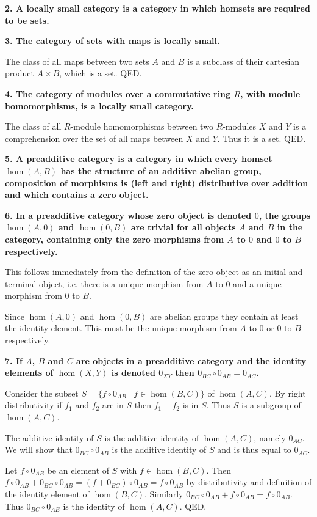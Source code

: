 \documentclass[12pt]{article}
\begin{document}
\textbf{2. A locally small category is a category in which homsets are required to be sets.}

\textbf{3. The category of sets with maps is locally small.}

The class of all maps between two sets $A$ and $B$ is a subclass of their cartesian product $A\times B$, which is a set. QED.

\textbf{4. The category of modules over a commutative ring $R$, with module homomorphisms, is a locally small category.}

The class of all $R$-module homomorphisms between two $R$-modules $X$ and $Y$ is a comprehension over the set of all maps between $X$ and $Y$. Thus it is a set. QED.

\textbf{5. A preadditive category is a category in which every homset $\hom(A, B)$ has the structure of an additive abelian group, composition of morphisms is (left and right) distributive over addition and which contains a zero object.}

\textbf{6. In a preadditive category whose zero object is denoted $0$, the groups $\hom(A, 0)$ and $\hom(0, B)$ are trivial for all objects $A$ and $B$ in the category, containing only the zero morphisms from $A$ to $0$ and $0$ to $B$ respectively.}

This follows immediately from the definition of the zero object as an initial and terminal object, i.e. there is a unique morphism from $A$ to $0$ and a unique morphism from $0$ to $B$.

Since $\hom(A, 0)$ and $\hom(0, B)$ are abelian groups they contain at least the identity element. This must be the unique morphism from $A$ to $0$ or $0$ to $B$ respectively.

\textbf{7. If $A$, $B$ and $C$ are objects in a preadditive category and the identity elements of $\hom(X, Y)$ is denoted $0_{XY}$ then $0_{BC}\circ 0_{AB} = 0_{AC}$.}

Consider the subset $S = \{f\circ 0_{AB} \;|\; f \in \hom(B, C)\}$ of $\hom(A, C)$. By right distributivity if $f_1$ and $f_2$ are in $S$ then $f_1 - f_2$ is in $S$. Thus $S$ is a subgroup of $\hom(A, C)$.

The additive identity of $S$ is the additive identity of $\hom(A, C)$, namely $0_{AC}$. We will show that $0_{BC}\circ 0_{AB}$ is the additive identity of $S$ and is thus equal to $0_{AC}$.

Let $f\circ 0_{AB}$ be an element of $S$ with $f \in \hom(B, C)$. Then $f\circ 0_{AB} + 0_{BC}\circ 0_{AB} = (f + 0_{BC})\circ 0_{AB} = f\circ 0_{AB}$ by distributivity and definition of the identity element of $\hom(B, C)$. Similarly $0_{BC}\circ 0_{AB} + f\circ 0_{AB} = f\circ 0_{AB}$. Thus $0_{BC}\circ 0_{AB}$ is the identity of $\hom(A, C)$. QED.
\end{document}
